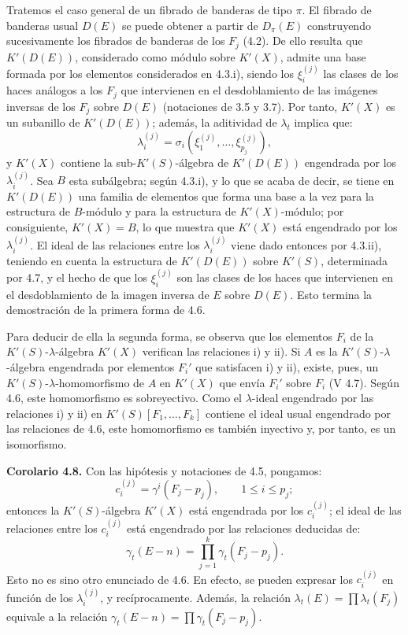 Tratemos el caso general de un fibrado de banderas de tipo \(\pi\). El fibrado de banderas usual \(D(E)\) se puede obtener a partir de \(D_\pi(E)\) construyendo sucesivamente los fibrados de banderas de los \(F_j\) (4.2). De ello resulta que \(K'(D(E))\), considerado como módulo sobre \(K'(X)\), admite una base formada por los elementos considerados en 4.3.i), siendo los \(\xi_i^{(j)}\) las clases de los haces análogos a los \(F_j\) que intervienen en el desdoblamiento de las imágenes inversas de los \(F_j\) sobre \(D(E)\) (notaciones de 3.5 y 3.7). Por tanto, \(K'(X)\) es un subanillo de \(K'(D(E))\); además, la aditividad de \(\lambda_t\) implica que:
\[
  \lambda_i^{(j)}=\sigma_i(\xi_1^{(j)},\ldots,\xi_{p_j}^{(j)}),
\]
y \(K'(X)\) contiene la sub-\(K'(S)\)-álgebra de \(K'(D(E))\) engendrada por los \(\lambda_i^{(j)}\). Sea \(B\) esta subálgebra; según 4.3.i), y lo que se acaba de decir, se tiene en \(K'(D(E))\) una familia de elementos que forma una base a la vez para la estructura de \(B\)-módulo y para la estructura de \(K'(X)\)-módulo; por consiguiente, \(K'(X)=B\), lo que muestra que \(K'(X)\) está engendrado por los \(\lambda_i^{(j)}\). El ideal de las relaciones entre los \(\lambda_i^{(j)}\) viene dado entonces por 4.3.ii), teniendo en cuenta la estructura de \(K'(D(E))\) sobre \(K'(S)\), determinada por 4.7, y el hecho de que los \(\xi_i^{(j)}\) son las clases de los haces que intervienen en el desdoblamiento de la imagen inversa de \(E\) sobre \(D(E)\). Esto termina la demostración de la primera forma de 4.6.

Para deducir de ella la segunda forma, se observa que los elementos \(F_i\) de la \(K'(S)\)-\(\lambda\)-álgebra \(K'(X)\) verifican las relaciones i) y ii). Si \(A\) es la \(K'(S)\)-\(\lambda\)-álgebra engendrada por elementos \(F_i'\) que satisfacen i) y ii), existe, pues, un \(K'(S)\)-\(\lambda\)-homomorfismo de \(A\) en \(K'(X)\) que envía \(F_i'\) sobre \(F_i\) (V 4.7). Según 4.6, este homomorfismo es sobreyectivo. Como el \(\lambda\)-ideal engendrado por las relaciones i) y ii) en \(K'(S)[F_1,\ldots,F_k]\) contiene el ideal usual engendrado por las relaciones de 4.6, este homomorfismo es también inyectivo y, por tanto, es un isomorfismo.

\textbf{Corolario 4.8.} Con las hipótesis y notaciones de 4.5, pongamos:
\[
  c_i^{(j)}=\gamma^i(F_j-p_j),
  \qquad 1\le i\le p_j;
\]
entonces la \(K'(S)\)-álgebra \(K'(X)\) está engendrada por los \(c_i^{(j)}\); el ideal de las relaciones entre los \(c_i^{(j)}\) está engendrado por las relaciones deducidas de:
\[
  \gamma_t(E-n)=\prod_{j=1}^{k}\gamma_t(F_j-p_j).
\]
Esto no es sino otro enunciado de 4.6. En efecto, se pueden expresar los \(c_i^{(j)}\) en función de los \(\lambda_i^{(j)}\), y recíprocamente. Además, la relación \(\lambda_t(E)=\prod\lambda_t(F_j)\) equivale a la relación \(\gamma_t(E-n)=\prod\gamma_t(F_j-p_j)\).

